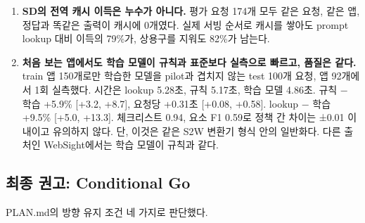 \documentclass[10pt,a4paper]{article}
\begin{document}
\begin{enumerate}[leftmargin=1.3em]
 DOM 특징만의 몫은 0.96--1.70 호출이다. GPU 실측은 아직 없다.
\item \textbf{SD의 전역 캐시 이득은 누수가 아니다.}
 평가 요청 174개 모두 같은 요청, 같은 앱, 정답과 똑같은 출력이 캐시에 0개였다. 실제 서빙 순서로 캐시를 쌓아도 prompt lookup 대비 이득의 79\%가, 상용구를 지워도 82\%가 남는다.
\item \textbf{처음 보는 앱에서도 학습 모델이 규칙과 표준보다 실측으로 빠르고, 품질은 같다.}
 train 앱 150개로만 학습한 모델을 pilot과 겹치지 않는 test 100개 요청, 앱 92개에서 1회 실측했다. 시간은 lookup 5.28초, 규칙 5.17초, 학습 모델 4.86초. 규칙 − 학습 +5.9\% [+3.2, +8.7], 요청당 +0.31초 [+0.08, +0.58]. lookup − 학습 +9.5\% [+5.0, +13.3]. 체크리스트 0.94, 요소 F1 0.59로 정책 간 차이는 ±0.01 이내이고 유의하지 않다. 단, 이것은 같은 S2W 변환기 형식 안의 일반화다. 다른 출처인 WebSight에서는 학습 모델이 규칙과 같다.
\end{enumerate}

\subsection*{최종 권고: Conditional Go}
PLAN.md의 방향 유지 조건 네 가지로 판단했다.
\end{document}
